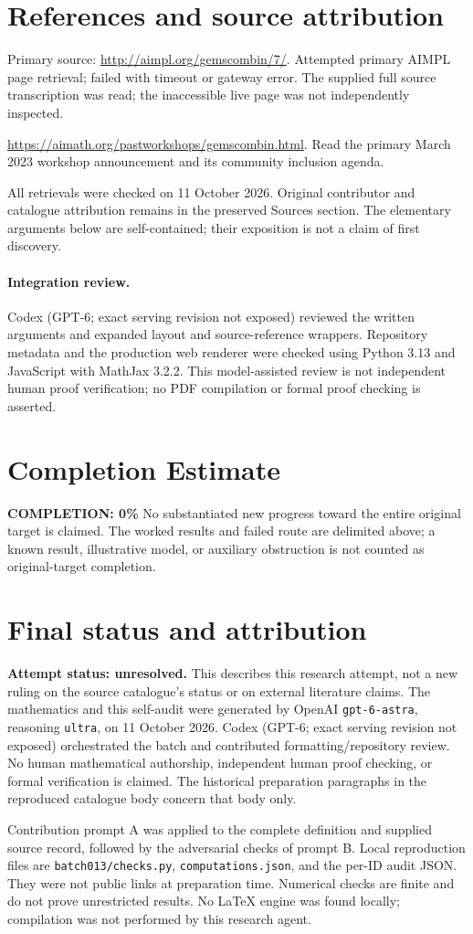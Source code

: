 \documentclass[11pt]{article}
\begin{document}
\section{References and source attribution}
Primary source: \url{http://aimpl.org/gemscombin/7/}. Attempted primary AIMPL page retrieval; failed with timeout or gateway error. The supplied full source transcription was read; the inaccessible live page was not independently inspected.

\url{https://aimath.org/pastworkshops/gemscombin.html}. Read the primary March 2023 workshop announcement and its community inclusion agenda.

All retrievals were checked on 11 October 2026. Original contributor and catalogue attribution remains in the preserved Sources section. The elementary arguments below are self-contained; their exposition is not a claim of first discovery.


\paragraph{Integration review.} Codex (GPT-6; exact serving revision not exposed) reviewed the written arguments and expanded layout and source-reference wrappers. Repository metadata and the production web renderer were checked using Python 3.13 and JavaScript with MathJax 3.2.2. This model-assisted review is not independent human proof verification; no PDF compilation or formal proof checking is asserted.

\section{Completion Estimate}
\noindent\textbf{COMPLETION: 0\%}
No substantiated new progress toward the entire original target is claimed. The worked results and failed route are delimited above; a known result, illustrative model, or auxiliary obstruction is not counted as original-target completion.

\section{Final status and attribution}
\textbf{Attempt status: unresolved.} This describes this research attempt, not a new ruling on the source catalogue's status or on external literature claims.
The mathematics and this self-audit were generated by OpenAI \texttt{gpt-6-astra}, reasoning \texttt{ultra}, on 11 October 2026. Codex (GPT-6; exact serving revision not exposed) orchestrated the batch and contributed formatting/repository review. No human mathematical authorship, independent human proof checking, or formal verification is claimed. The historical preparation paragraphs in the reproduced catalogue body concern that body only.

Contribution prompt A was applied to the complete definition and supplied source record, followed by the adversarial checks of prompt B. Local reproduction files are \texttt{batch013/checks.py}, \texttt{computations.json}, and the per-ID audit JSON. They were not public links at preparation time. Numerical checks are finite and do not prove unrestricted results. No LaTeX engine was found locally; compilation was not performed by this research agent.
\end{document}
